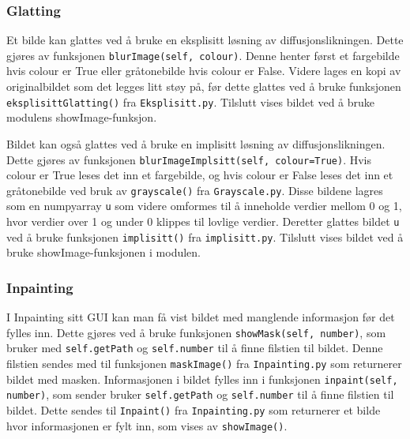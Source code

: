 \subsubsection{Glatting}
Et bilde kan glattes ved å bruke en eksplisitt løsning av diffusjonslikningen. Dette gjøres av funksjonen \texttt{blurImage(self, colour)}. Denne henter først et fargebilde hvis colour er True eller gråtonebilde hvis colour er False. Videre lages en kopi av originalbildet som det legges litt støy på, før dette glattes ved å bruke funksjonen \texttt{eksplisittGlatting()} fra \texttt{Eksplisitt.py}. Tilslutt vises bildet ved å bruke modulens showImage-funksjon.

Bildet kan også glattes ved å bruke en implisitt løsning av diffusjonslikningen. Dette gjøres av funksjonen \texttt{blurImageImplsitt(self, colour=True)}. Hvis colour er True leses det inn et fargebilde, og hvis colour er False leses det inn et gråtonebilde ved bruk av \texttt{grayscale()} fra \texttt{Grayscale.py}. Disse bildene lagres som en numpyarray \texttt{u} som videre omformes til å inneholde verdier mellom 0 og 1, hvor verdier over 1 og under 0 klippes til lovlige verdier. Deretter glattes bildet \texttt{u} ved å bruke funksjonen \texttt{implisitt()} fra \texttt{implisitt.py}. Tilslutt vises bildet ved å bruke showImage-funksjonen i modulen.

\subsubsection{Inpainting}
I Inpainting sitt GUI kan man få vist bildet med manglende informasjon før det fylles inn. Dette gjøres ved å bruke funksjonen \texttt{showMask(self, number)}, som bruker med \texttt{self.getPath} og \texttt{self.number} til å finne filstien til bildet. Denne filstien sendes med til funksjonen \texttt{maskImage()} fra \texttt{Inpainting.py} som returnerer bildet med masken. Informasjonen i bildet fylles inn i funksjonen \texttt{inpaint(self, number)}, som sender bruker \texttt{self.getPath} og \texttt{self.number} til å finne filstien til bildet. Dette sendes til \texttt{Inpaint()} fra \texttt{Inpainting.py} som returnerer et bilde hvor informasjonen er fylt inn, som vises av \texttt{showImage()}. 

